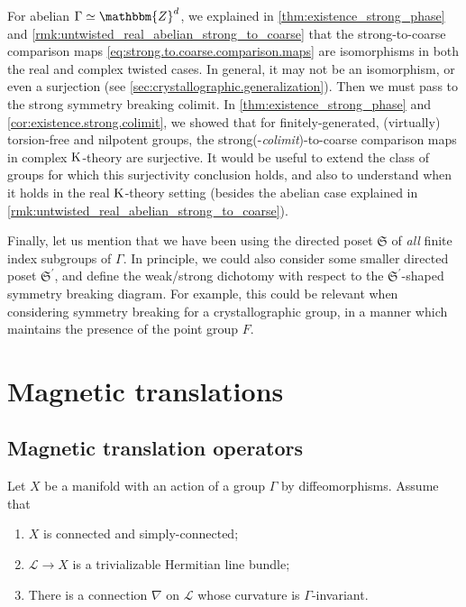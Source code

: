 \documentclass{amsart}
\numberwithin{figure}{section}
\numberwithin{equation}{section}
\numberwithin{table}{section}
\theoremstyle{plain}
\theoremstyle{definition}
\theoremstyle{remark}
\theoremstyle{nonumber}
\newcommand{\Z}{\mathbb{Z}}
\newcommand{\K}{\relax\ifmmode\operatorname{K}\else\textup{K}\fi}
\renewcommand{\mathbb}{\mathbbm} %
\begin{document}
For abelian $\Gamma\simeq\Z^d$, we explained in
\cref{thm:existence_strong_phase} and
\cref{rmk:untwisted_real_abelian_strong_to_coarse}
that the strong-to-coarse comparison maps
\eqref{eq:strong.to.coarse.comparison.maps} are isomorphisms in both the
real and complex twisted cases. In general, it may not be an isomorphism,
or even a surjection (see
\cref{sec:crystallographic.generalization}). 
Then we must pass to the strong symmetry breaking colimit.
In \cref{thm:existence_strong_phase} and \cref{cor:existence.strong.colimit}, we showed that for
finitely-generated, (virtually) torsion-free and nilpotent groups, the
strong(-\emph{colimit})-to-coarse comparison maps in complex $\K$-theory are
surjective. It would be useful to extend the class of groups for which
this surjectivity conclusion holds, and also to understand when it holds in the real $\K$-theory setting (besides the abelian case explained in \cref{rmk:untwisted_real_abelian_strong_to_coarse}).

Finally, let us mention that we have been using the directed poset
$\mathfrak{S}$ of \emph{all} finite index subgroups of $\Gamma$. In
principle, we could also consider some smaller directed poset
$\mathfrak{S}^\prime$, and define the weak/strong dichotomy with respect to
the $\mathfrak{S}^\prime$-shaped symmetry breaking diagram. For example,
this could be relevant when considering symmetry breaking for a
crystallographic group, in a manner which maintains the presence of the
point group $F$.



\appendix
\section{Magnetic translations}
\subsection{Magnetic translation operators}\label{sec:magnetic_translations}
Let $X$ be a manifold with an action of a group $\Gamma$ by diffeomorphisms. 
Assume that
\begin{enumerate}
\item $X$ is connected and simply-connected;
\item $\mathcal{L}\to X$ is a trivializable Hermitian line bundle;
\item There is a connection $\nabla$ on $\mathcal{L}$ whose curvature is $\Gamma$-invariant.
\end{enumerate}
\end{document}
